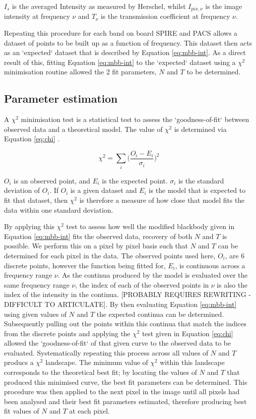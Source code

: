 \documentclass{report}
\begin{document}
$I_{s}$ is the averaged Intensity as measured by Herschel, whilst $I_{pix,\nu}$ is the image intensity at frequency $\nu$ and $T_{\nu}$ is the transmission coefficient at frequency $\nu$.

Repeating this procedure for each band on board SPIRE and PACS allows a dataset of points to be built up as a function of frequency. This dataset then acts as an `expected` dataset that is described by Equation \ref{eq:mbb-int}. As a direct result of this, fitting Equation \ref{eq:mbb-int} to the `expected` dataset using a $\chi^{2}$ minimisation routine allowed the 2 fit parameters, $N$ and $T$ to be determined.

\subsection{Parameter estimation}
A $\chi^{2}$ minimisation test is a statistical test to assess the `goodness-of-fit` between observed data and a theoretical model. The value of $\chi^{2}$ is determined via Equation \ref{eq:chi} \parencite{error}.

\begin{equation}
  \chi^{2} = \sum_{i}\Bigg (\frac{O_{i}-E_{i}}{\sigma_{i}} \Bigg )^{2}
\end{equation} \label{eq:chi}

$O_{i}$ is an observed point, and $E_{i}$ is the expected point. $\sigma_{i}$ is the standard deviation of $O_{i}$. If $O_{i}$ is a given dataset and $E_{i}$ is the model that is expected to fit that dataset, then $\chi^{2}$ is therefore a measure of how close that model fits the data within one standard deviation.

By applying this $\chi^{2}$ test to assess how well the modified blackbody given in Equation \ref{eq:mbb-int} fits the observed data, recovery of both $N$ and $T$ is possible. We perform this on a pixel by pixel basis such that $N$ and $T$ can be determined for each pixel in the data. The observed points used here, $O_{i}$, are 6 discrete points, however the function being fitted for, $E_{i}$, is continuous across a frequency range $\nu$. As the continua produced by the model is evaluated over the same frequency range $\nu$, the index of each of the observed points in $\nu$ is also the index of the intensity in the continua. [PROBABLY REQUIRES REWRITING - DIFFICULT TO ARTICULATE]. By then evaluating Equation \ref{eq:mbb-int} using given values of $N$ and $T$ the expected continua can be determined. Subsequently pulling out the points within this continua that match the indices from the discrete points and applying the
$\chi^{2}$ test given in Equation \ref{eq:chi} allowed the `goodness-of-fit` of that given curve to the observed data to be evaluated. Systematically repeating this process across all values of $N$ and $T$ producs a $\chi^{2}$ landscape. The minimum value of $\chi^{2}$ within this landscape corresponds to the theoretical best fit; by locating the values of $N$ and $T$ that produced this minimised curve, the best fit parameters can be determined. This procedure was then applied to the next pixel in the image until all pixels had been analysed and their best fit parameters estimated, therefore producing best fit values of $N$ and $T$ at each pixel.
\end{document}
